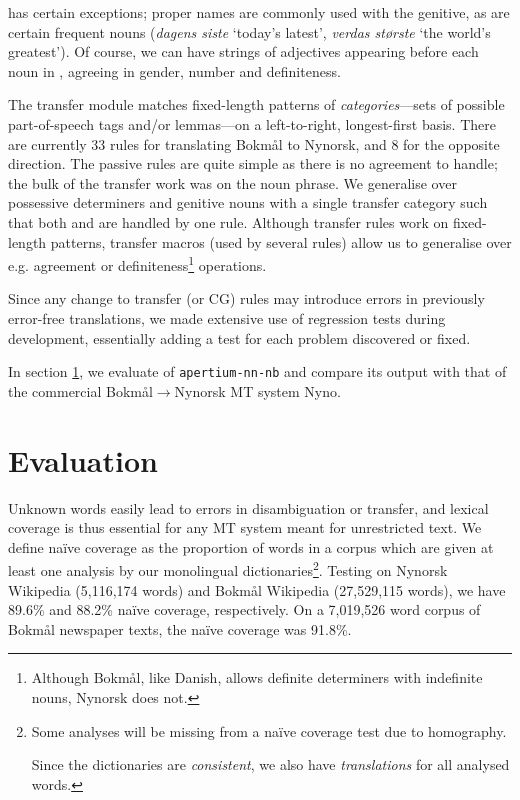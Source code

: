 \documentclass[11pt]{article}
\begin{document}
\Last has certain exceptions; proper names are commonly used with the
genitive, as are certain frequent nouns (\emph{dagens siste} `today's
latest', \emph{verdas største} `the world's greatest'). Of course, we
can have strings of adjectives appearing before each noun in
\Last[a-d], agreeing in gender, number and definiteness. 

The transfer module matches fixed-length patterns of
\emph{categories}—sets of possible part-of-speech tags and/or
lemmas—on a left-to-right, longest-first basis. There are currently 33
rules for translating Bokmål to Nynorsk, and 8 for the opposite
direction. The passive rules are quite simple as there is no agreement
to handle; the bulk of the transfer work was on the noun phrase. We
generalise over possessive determiners and genitive nouns with a
single transfer category such that both \Last[a-b] and \Last[c-d] are
handled by one rule. Although transfer rules work on fixed-length
patterns, transfer macros (used by several rules) allow us to
generalise over e.g. agreement or definiteness\footnote{Although
  Bokmål, like Danish, allows definite determiners with indefinite
  nouns, Nynorsk does not.} operations.

Since any change to transfer (or CG) rules may introduce
errors in previously error-free translations, we made extensive use of
regression tests during development, essentially adding a test for
each problem discovered or fixed.

In section \ref{sec:eval}, we evaluate of {\tt \small  apertium-nn-nb} and
compare its output with that of the commercial
Bokmål$\rightarrow$Nynorsk MT system Nyno.


\section{Evaluation}
\label{sec:eval}

Unknown words easily lead to errors in disambiguation or
transfer, and lexical coverage is thus essential for any MT system meant for
unrestricted text.  We define naïve coverage as the proportion of
words in a corpus which are given at least one analysis by our
monolingual dictionaries\footnote{Some analyses will be missing from a
naïve coverage test due to homography. 

Since the dictionaries are \emph{consistent}, we also have
\emph{translations} for all analysed words.}. Testing on Nynorsk
Wikipedia (5,116,174 words) and Bokmål Wikipedia (27,529,115 words),
we have 89.6\% and 88.2\% naïve coverage, respectively. On a 7,019,526
word corpus of Bokmål newspaper texts, the naïve coverage was 91.8\%.
\end{document}
